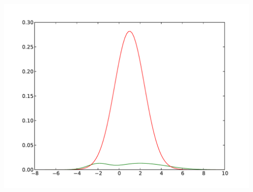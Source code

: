 \documentclass[solution, letterpaper]{cs121}
\begin{document}
\begin{empfile}

\subproblem %

  \includegraphics[width=170mm]{mixture_o_gaussians.pdf}



\end{empfile}

\immediate{}
\end{document}
